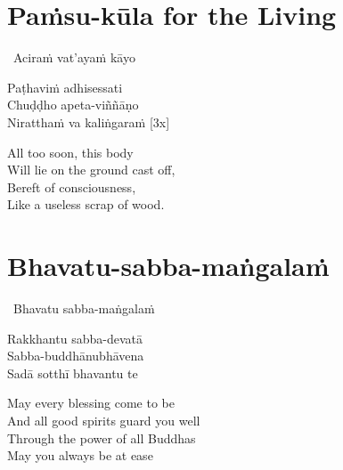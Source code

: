 \suttaRef{[Thai]}

\section{Paṁsu-kūla for the Living}
\label{pamsu-kula-living}

\begin{pali-leader}
  \anglebracketleft\ \hspace{-0.5mm}Aciraṁ vat'ayaṁ kāyo \hspace{-0.5mm}\anglebracketright\
\end{pali-leader}
\begin{pali-hangtogether}
  Paṭhaviṁ adhisessati\\
  Chuḍḍho apeta-viññāṇo\\
  Niratthaṁ va kaliṅgaraṁ \hfill{[3x]}
\end{pali-hangtogether}

\begin{english-verses}
  All too soon, this body\\
  Will lie on the ground cast off,\\
  Bereft of consciousness,\\
  Like a useless scrap of wood.
\end{english-verses}

\suttaRef{[Dhp 41]}

\section{Bhavatu-sabba-maṅgalaṁ}
\label{bhavatu}

\begin{pali-leader}
  \anglebracketleft\ \hspace{-0.5mm}Bhavatu sabba-maṅgalaṁ \hspace{-0.5mm}\anglebracketright\
\end{pali-leader}
\begin{pali-hangtogether}
  Rakkhantu sabba-devatā\\
  Sabba-buddhānubhāvena\\
  Sadā sotthī bhavantu te
\end{pali-hangtogether}

\begin{english-verses}
  May every blessing come to be\\
  And all good spirits guard you well\\
  Through the power of all Buddhas\\
  May you always be at ease
\end{english-verses}

